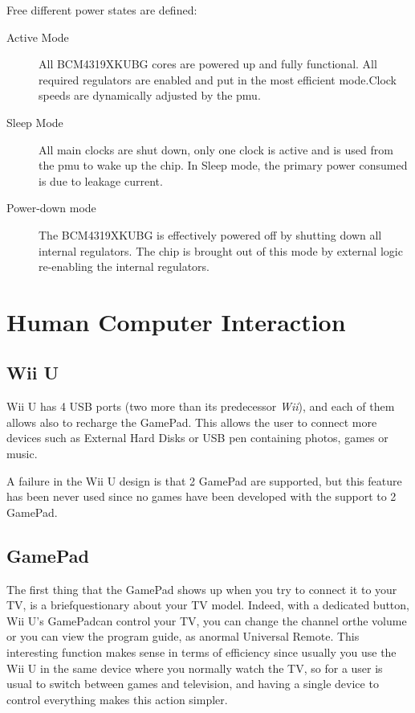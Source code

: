 \documentclass[11pt,a4paper,titlepage]{article}
\begin{document}
		Free different power states are defined:
		\begin{description}
			\item [Active Mode] All BCM4319XKUBG cores are powered up and fully functional. All required regulators are enabled and put in the most efficient mode.Clock speeds are dynamically adjusted by the \gls{pmu}.
			\item [Sleep Mode] All main clocks are shut down, only one clock is active and is used from the \gls{pmu} to wake up the chip. In Sleep mode, the primary power consumed is due to leakage current.
			\item	[Power-down mode] The BCM4319XKUBG is effectively powered off by shutting down all internal regulators. The chip is brought out of this mode by external logic re-enabling the internal regulators.

		\end{description}
	\section{Human Computer Interaction}
		\subsection{Wii U}
			Wii U has 4 USB ports (two more than its predecessor \textit{Wii}), and each of them allows also to recharge the GamePad. This allows the user to connect more devices such as External Hard Disks or USB pen containing photos, games or music.

			A failure in the Wii U design is that 2 GamePad are supported, but this feature has been never used since no games have been developed with the support to 2 GamePad.
		\subsection{GamePad}
			The first thing that the GamePad shows up when you try to connect it to your TV, is a briefquestionary about your TV model.
			Indeed, with a dedicated button, Wii U's GamePadcan control your TV, you can change the channel orthe volume or you can view the program guide, as anormal Universal Remote.
			This interesting function makes sense in terms of efficiency since usually you use the Wii U in the same device where you normally watch the TV, so for a user is usual to switch between games and television, and having a single device to control everything makes this action simpler.
\end{document}
